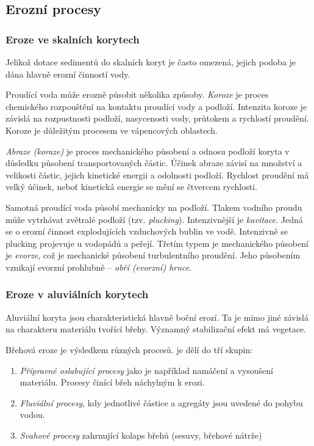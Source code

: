 \subsection{Erozní procesy}

\subsubsection{Eroze ve skalních korytech}
Jelikož dotace sedimentů do skalních koryt je často omezená, jejich podoba je dána hlavně erozní činností vody. 

Proudící voda může erozně působit několika způsoby. \emph{Koroze} je proces chemického rozpouštění na kontaktu proudící vody a podloží. Intenzita koroze je závislá na rozpustnosti podloží, nasycenosti vody, průtokem a rychlostí proudění. Koroze je důležitým procesem ve vápencových oblastech.

\emph{Abraze (koraze)} je proces mechanického působení a odnosu podloží koryta v důsledku působení transportovaných částic. Účinek abraze závisí na množství a velikosti částic, jejich kinetické energii a odolnosti podloží. Rychlost proudění má velký účinek, neboť kinetická energie se mění se čtvercem rychlosti. 

Samotná proudící voda působí mechanicky na podloží. Tlakem vodního proudu může vytrhávat zvětralé podloží (tzv. \emph{plucking}). Intenzivnější je \emph{kavitace}. Jedná se o erozní činnost explodujících vzduchových bublin ve vodě. Intenzivně se plucking projevuje u vodopádů a peřejí. Třetím typem je mechanického působení je \emph{evorze}, což je mechanické působení turbulentního proudění. Jeho působením vznikají evorzní prohlubně -- \emph{obří (evorzní) hrnce}.

\subsubsection{Eroze v aluviálních korytech}
Aluviální koryta jsou charakteristická hlavně boční erozí. Ta je mimo jiné závislá na charakteru materiálu tvořící břehy. Významný stabilizační efekt má vegetace.

Břehová eroze je výsledkem různých procesů. \textcite{charltonFundamentalsFluvialGeomorphology2007} je dělí do tří skupin:
\begin{enumerate}
	\item \emph{Přípravné oslabující procesy} jako je například namáčení a vysoušení materiálu. Procesy činící břeh náchylným k erozi.
	\item \emph{Fluviální procesy}, kdy jednotlivé částice a agregáty jsou uvedené do pohybu vodou.
	\item \emph{Svahové procesy} zahrnující kolaps břehů (sesuvy, břehové nátrže)
\end{enumerate}

